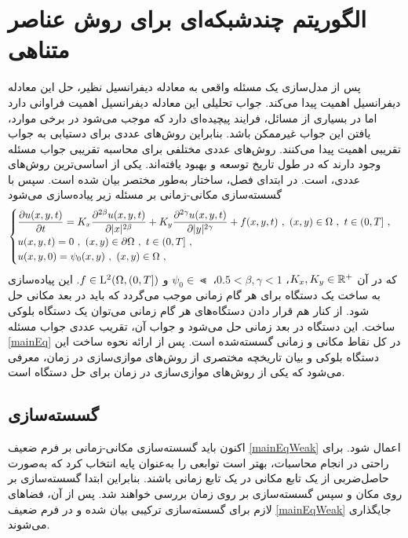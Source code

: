 \chapter{
الگوریتم چندشبکه‌ای برای روش عناصر متناهی
}
\label{chp:chap2}\thispagestyle{empty}
پس از مدل‌سازی یک مسئله واقعی به معادله دیفرانسیل نظیر، حل این معادله دیفرانسیل اهمیت پیدا می‌کند.
جواب تحلیلی این معادله دیفرانسیل اهمیت فراوانی دارد اما در بسیاری از مسائل، فرایند پیچیده‌ای دارد که موجب می‌شود در برخی موارد، یافتن این جواب غیرممکن باشد.
بنابراین روش‌های عددی برای دستیابی به جواب تقریبی اهمیت پیدا می‌کنند.
روش‌های عددی مختلفی برای محاسبه تقریبی جواب مسئله وجود دارند که در طول تاریخ توسعه و بهبود یافته‌اند.
یکی از اساسی‌ترین روش‌های عددی،
است.
در ابتدای فصل، ساختار
به‌طور مختصر بیان شده است.
سپس 
با گسسته‌سازی مکانی-زمانی بر مسئله
زیر پیاده‌سازی می‌شود
\begin{equation}
\label{mainEq}
\begin{cases}
{ \displaystyle\frac{\partial u(x, y, t)}{\partial t} } = K_{x} { \displaystyle\frac{\partial^{2 \beta} u(x, y, t)}{\partial |x|^{2 \beta}} } + K_{y} { \displaystyle\frac{\partial^{2 \gamma} u(x,y,t)}{\partial |y|^{2 \gamma}} } + f(x,y,t)
\ , \ 
(x,y) \in \Omega
\ , \ 
t \in (0,T]
\ ,
\\
u(x,y,t)=0
\ , \ 
(x,y) \in \partial\Omega
\ , \ 
t \in (0,T]
\ ,
\\
u(x,y,0) = \psi _{0} (x,y)
\ , \ 
(x,y) \in \Omega
\ ,
\end{cases}
\end{equation}
که در آن
$K_{x}, K_{y} \in \mathbb{R}^{+}$،
$0.5 < \beta, \gamma < 1$،
$\psi_{0} \in \Lt$
و
$f \in \mathrm{L}^{2}(\Omega , (0, T])$.
این پیاده‌سازی به ساخت یک دستگاه برای هر گام زمانی موجب می‌گردد که باید در بعد مکانی حل شود.
از کنار هم قرار دادن دستگاه‌های هر گام زمانی می‌توان یک دستگاه بلوکی ساخت.
این دستگاه در بعد زمانی حل می‌شود و جواب آن، تقریب عددی جواب مسئله
\eqref{mainEq}
در کل نقاط مکانی و زمانی گسسته‌شده است. 
پس از ارائه نحوه ساخت این دستگاه بلوکی و بیان تاریخچه مختصری از روش‌های موازی‌سازی در زمان،
معرفی می‌شود که یکی از روش‌های موازی‌سازی در زمان برای حل دستگاه است.
\section{
گسسته‌سازی
}
اکنون باید گسسته‌سازی مکانی-زمانی بر فرم ضعیف
\eqref{mainEqWeak}
اعمال شود.
برای راحتی در انجام محاسبات، بهتر است توابعی را به‌عنوان پایه انتخاب کرد که به‌صورت حاصل‌ضربی از یک تابع مکانی در یک تابع زمانی باشند.
بنابراین ابتدا گسسته‌سازی بر روی مکان و سپس گسسته‌سازی بر روی زمان بررسی خواهند شد.
پس از آن، فضاهای لازم برای گسسته‌سازی ترکیبی بیان شده و در فرم ضعیف
\eqref{mainEqWeak}
جایگذاری می‌شوند.
